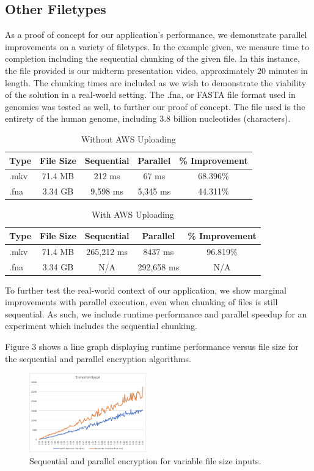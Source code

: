 \documentclass[conference]{IEEEtran}
\begin{document}
\subsection{Other Filetypes}
As a proof of concept for our application's performance, we demonstrate parallel improvements on 
a variety of filetypes. In the example given, we measure time to completion including the sequential chunking
of the given file. In this instance, the file provided is our midterm presentation video, approximately 20 minutes 
in length. The chunking times are included as we wish to demonstrate the viability of the solution in a real-world
setting. The .fna, or FASTA file format used in genomics was tested as well, to further our proof of concept. The 
file used is the entirety of the human genome, including 3.8 billion nucleotides (characters).

\begin{table}[ht]
	\centering
	\caption{Without AWS Uploading}
	\begin{tabular}[t]{lcccc}
	\toprule
	Type&File Size&Sequential&Parallel&\% Improvement\\
	\midrule
	.mkv&71.4 MB&212 ms&67 ms&68.396\%\\
	.fna&3.34 GB&9,598 ms&5,345 ms&44.311\%\\
	\bottomrule
	\end{tabular}
\end{table}%
	
\begin{table}[ht]
	\centering
	\caption{With AWS Uploading}
	\begin{tabular}[t]{lcccc}
	\toprule
	Type&File Size&Sequential&Parallel&\% Improvement\\
	\midrule
	.mkv&71.4 MB&265,212 ms&8437 ms&96.819\%\\
	.fna&3.34 GB&N/A&292,658 ms&N/A\\
	\bottomrule
	\end{tabular}
\end{table}%

To further test the real-world context of our application, we show marginal improvements with
parallel execution, even when chunking of files is still sequential. As such, we include 
runtime performance and parallel speedup for an experiment which includes the sequential chunking.

Figure 3 shows a line graph displaying runtime performance versus file size for the sequential and parallel encryption
algorithms.

\begin{figure}[h]
	\caption{Sequential and parallel encryption for variable file size inputs.}
	\centering
	\includegraphics[width=0.45\textwidth]{encryption-speed-line.png}
\end{figure}
\end{document}
